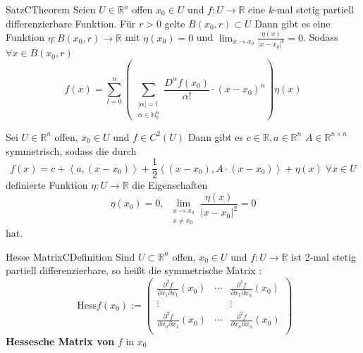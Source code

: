 %
%
%
%
\begin{ibox}[41]{Satz}{CTheorem}
    Seien $ U \in \mathbb{R}^n  $ offen $ x_0 \in U $ und $ f: U \to \mathbb{R}  $ eine $ k $-mal stetig partiell differenzierbare 
	Funktion. Für $ r>0 $ gelte $ B(x_0,r) \subset U$  Dann gibt es eine Funktion $ \eta : B \left( x_0, r \right) \to \mathbb{R}  $ 
	mit $ \eta \left(x_0\right)  = 0 $ und $ \lim_{ x \to x_0} \frac{\eta \left(x\right) }{|x-x_0|^{k}}  = 0 $. Sodass $ \forall  x \in 
	B \left( x_0, r \right) $ 
	$$ f(x) = \sum_{l=0}^{n} \left(\, \sum_{\substack{ |\alpha| = l \\ \alpha \in \mathbb{N}_{0}^{n} }} \frac{D^{\alpha }f
	\left(x_0\right) }{\alpha !} \cdot \left( x - x_0 \right) ^{\alpha }  \right) \eta \left(x\right)   $$
\end{ibox}
Sei $ U \in \mathbb{R}^n  $ offen, $ x_0 \in U $ und $ f \in  C^{2} \left(U\right)  $ Dann gibt es $ c \in \mathbb{R} , a \in \mathbb{R}^n $
$ A \in \mathbb{R}^{n \times n}  $ symmetrisch, sodass die durch 
$$ f \left(x\right)  = c + \left< a, \left( x - x_0 \right)  \right> + \frac{1}{2} \left<(x-x_0), A \cdot (x-x_0) \right> + 
\eta \left(x\right) \; \forall x \in U	$$ 
definierte Funktion $ \eta : U \to \mathbb{R}  $ die Eigenschaften 
$$ \eta \left(x_0\right)  = 0 , \; \lim_{ \substack{ x \to x_0 \\x \neq x_0 } } \frac{\eta \left(x\right) }{ |x - x_0|^{2}} = 0  $$
hat.
\begin{ibox}[]{Hesse Matrix}{CDefinition}
    Sind $ U \subset \mathbb{R}^n  $ offen, $ x_0 \in U $ und $ f: U \to \mathbb{R}  $ ist 2-mal stetig partiell differenzierbare, so
	heißt die symmetrische Matrix : 
	$$ \text{ Hess}f \left(x_0\right) := \begin{pmatrix}
		\frac{\partial ^{2} f}{\partial x_1 \partial x_1} \left(x_0\right) & \cdots    
	 	&\frac{\partial ^{2} f}{\partial x_1 \partial x_n} \left(x_0\right) \\
		\vdots & & \vdots \\
		\frac{\partial ^{2} f}{\partial x_n \partial x_1} \left(x_0\right) & \cdots    
	 	&\frac{\partial ^{2} f}{\partial x_n \partial x_n} \left(x_0\right) \\
	\end{pmatrix}
	  $$
\textbf{Hessesche Matrix von} $ f \text{ in } x_0 $ 	
\end{ibox}
